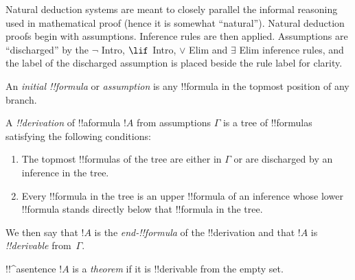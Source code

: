 \documentclass[../../include/open-logic-section]{subfiles}
\begin{document}
\begin{explain}
Natural deduction systems are meant to closely parallel the informal
reasoning used in mathematical proof (hence it is somewhat
``natural''). Natural deduction proofs begin with assumptions.
Inference rules are then applied. Assumptions are ``discharged'' by
the $\lnot$ Intro, $\lif$ Intro, $\lor$ Elim and $\exists$ Elim
inference rules, and the label of the discharged assumption is placed
beside the rule label for clarity.
\end{explain}

\begin{defn}
An \emph{initial !!{formula}} or \emph{assumption} is any !!{formula}
in the topmost position of any branch.
\end{defn}

\begin{defn}[!!^{derivation}]
A \emph{!!{derivation}} of !!a{formula} $!A$ from assumptions $\Gamma$
is a tree of !!{formula}s satisfying the following conditions:
\begin{enumerate}
\item The topmost !!{formula}s of the tree are either in $\Gamma$ or
  are discharged by an inference in the tree.
\item Every !!{formula} in the tree is an upper !!{formula} of an
  inference whose lower !!{formula} stands directly below that !!{formula} in
  the tree.
\end{enumerate}
We then say that $!A$ is the \emph{end-!!{formula}} of the
!!{derivation} and that $!A$ is \emph{!!{derivable}} from~$\Gamma$.
\end{defn}

\begin{defn}[Theorem]
!!^a{sentence} $!A$ is a \emph{theorem} if it is !!{derivable}
from the empty set.
\end{defn}
\end{document}
